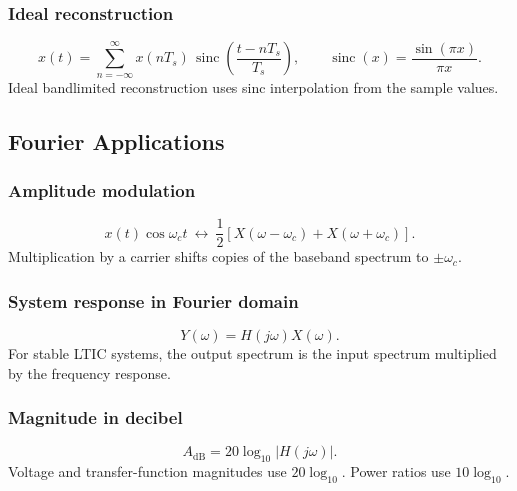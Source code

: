 \subsubsection{Ideal reconstruction}
\[
x(t)=\sum_{n=-\infty}^{\infty}x(nT_s)\,
\operatorname{sinc}\!\left(\frac{t-nT_s}{T_s}\right),
\qquad
\operatorname{sinc}(x)=\frac{\sin(\pi x)}{\pi x}.
\]
Ideal bandlimited reconstruction uses sinc interpolation from the sample values.

\subsection{Fourier Applications}

\subsubsection{Amplitude modulation}
\[
x(t)\cos\omega_ct
\ \longleftrightarrow\
\frac{1}{2}\left[X(\omega-\omega_c)+X(\omega+\omega_c)\right].
\]
Multiplication by a carrier shifts copies of the baseband spectrum to \(\pm\omega_c\).

\subsubsection{System response in Fourier domain}
\[
Y(\omega)=H(j\omega)X(\omega).
\]
For stable LTIC systems, the output spectrum is the input spectrum multiplied by the frequency response.

\subsubsection{Magnitude in decibel}
\[
A_{\mathrm{dB}}=20\log_{10}|H(j\omega)|.
\]
Voltage and transfer-function magnitudes use \(20\log_{10}\). Power ratios use \(10\log_{10}\).
